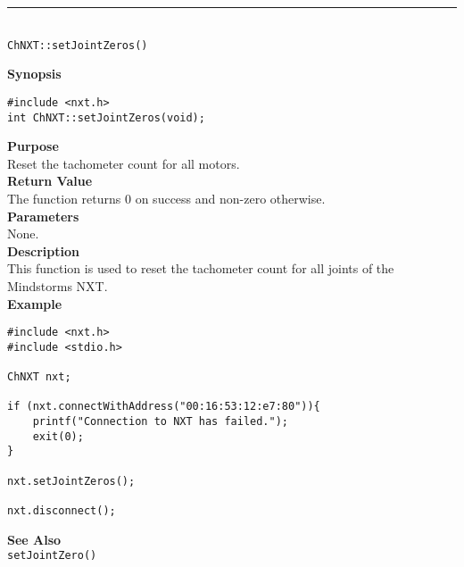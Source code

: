 \noindent
\vspace{5pt}
\rule{4.5in}{0.015in}\\
\noindent
{\LARGE \texttt{ChNXT::setJointZeros()} }\\


\noindent
{\bf Synopsis}
\vspace{-8pt}
\begin{verbatim}
#include <nxt.h>
int ChNXT::setJointZeros(void);
\end{verbatim}

\noindent
{\bf Purpose}\\
Reset the tachometer count for all motors.\\

\noindent
{\bf Return Value}\\
The function returns 0 on success and non-zero otherwise.\\

\noindent
{\bf Parameters}\\
None.\\

\noindent
{\bf Description}\\
This function is used to reset the tachometer count for 
all joints of the Mindstorms NXT.\\

\noindent
{\bf Example}
\begin{verbatim}
#include <nxt.h> 
#include <stdio.h>

ChNXT nxt;

if (nxt.connectWithAddress("00:16:53:12:e7:80")){
    printf("Connection to NXT has failed.");
    exit(0);
}
    
nxt.setJointZeros();

nxt.disconnect();
\end{verbatim}

\noindent
{\bf See Also}\\
\texttt{setJointZero()}\\
